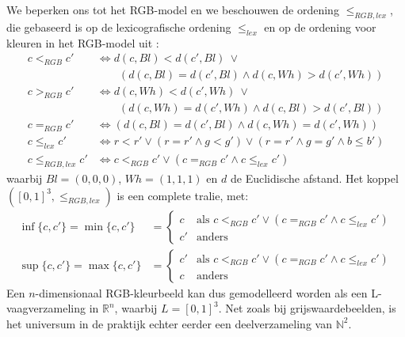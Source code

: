We beperken ons tot het RGB-model en we beschouwen de ordening $\leq_{RGB,lex}$, die
gebaseerd is op de lexicografische ordening $\leq_{lex}$ en op de ordening voor kleuren in het 
RGB-model uit \cite{dewitte:vect_morph_ops}:
\begin{align*}
c <_{RGB} c' & \iff d(c,Bl) < d(c',Bl)\ \lor \\
			 & \qquad (d(c,Bl) = d(c',Bl) \land d(c,Wh) > d(c',Wh)) \\
c >_{RGB} c' & \iff d(c,Wh) < d(c',Wh)\ \lor \\
			 & \qquad(d(c,Wh) = d(c',Wh) \land d(c,Bl) > d(c',Bl)) \\
c =_{RGB} c' & \iff (d(c,Bl) = d(c',Bl) \land d(c,Wh) = d(c',Wh)) \\
c \leq_{lex} c' & \iff r < r' \lor (r = r' \land g < g') \lor (r = r' \land g = g' \land b \leq b') \\
c \leq_{RGB,lex} c' & \iff c <_{RGB} c' \lor (c =_{RGB} c' \land c \leq_{lex} c')
\end{align*}
waarbij $Bl = (0,0,0)$, $Wh = (1,1,1)$ en $d$ de Euclidische afstand.
Het koppel $([0,1]^3,\leq_{RGB,lex})$ is een complete tralie, met:
\begin{align*}
\inf \{c,c'\} = \min \{c,c'\} &= \begin{cases}
c & \textrm{als } c <_{RGB} c' \lor (c =_{RGB} c' \land c \leq_{lex} c') \\
c' & \textrm{anders}
\end{cases} \\
\sup \{c,c'\} = \max \{c,c'\} & = \begin{cases}
c' & \textrm{als } c <_{RGB} c' \lor (c =_{RGB} c' \land c \leq_{lex} c') \\
c & \textrm{anders}
\end{cases}
\end{align*}
Een $n$-dimensionaal RGB-kleurbeeld kan dus gemodelleerd worden als een L-vaagverzameling in 
$\mathbb{R}^n$, waarbij $L=[0,1]^3$. Net zoals bij grijswaardebeelden, is 
het universum in de praktijk echter eerder een deelverzameling van $\mathbb{N}^2$.

